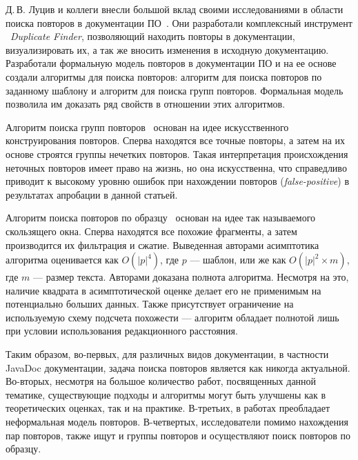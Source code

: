 Д.\,В. Луцив и коллеги внесли большой вклад своими исследованиями в области поиска повторов в документации ПО~\cite{luciv2018detecting,luciv2018duplicate,luciv2019interactive,koznov2015clone,koznov2017duplicate,luciv2016fuzzy}. 
Они разработали комплексный инструмент \
\emph{Duplicate Finder}, позволяющий  находить повторы в документации, визуализировать их, а так же вносить изменения в исходную документацию.
Разработали формальную модель повторов в документации ПО и на ее основе создали алгоритмы для поиска повторов:  алгоритм для поиска повторов по заданному шаблону и  алгоритм для поиска групп повторов.
Формальная модель позволила им доказать ряд свойств в отношении этих алгоритмов.

Алгоритм поиска групп повторов~\cite{luciv2016fuzzy} основан на идее искусственного конструирования повторов.
Сперва находятся все точные повторы, а затем на их основе строятся группы нечетких повторов.
Такая интерпретация происхождения неточных повторов имеет право на жизнь, но она искусственна, что справедливо приводит к высокому уровню ошибок при нахождении повторов (\emph{false-positive}) в результатах апробации в данной статьей.


Алгоритм поиска повторов по образцу~\cite{luciv2019interactive} основан на идее так называемого скользящего окна.
Сперва находятся все похожие фрагменты, а затем производится их фильтрация и сжатие.
Выведенная авторами асимптотика алгоритма оценивается как $O(|p|^4)$, где $p$ --- шаблон, или же как $O(|p|^2 \times m)$, где $m$ --- размер текста.
Авторами доказана полнота алгоритма.
Несмотря на это, наличие квадрата в асимптотической оценке делает его не применимым на потенциально больших данных.
Также присутствует ограничение на используемую схему подсчета похожести --- алгоритм обладает полнотой лишь при условии использования редакционного расстояния.

Таким образом, во-первых, для различных видов документации, в частности JavaDoc  документации, задача поиска повторов является  как никогда актуальной.
Во-вторых, несмотря на большое количество работ, посвященных  данной тематике, существующие подходы и алгоритмы могут быть  улучшены как в теоретических оценках, так и на практике.
В-третьих, в работах преобладает неформальная модель повторов.
В-четвертых, исследователи помимо нахождения пар повторов, также ищут и группы повторов и осуществляют поиск повторов по образцу.


